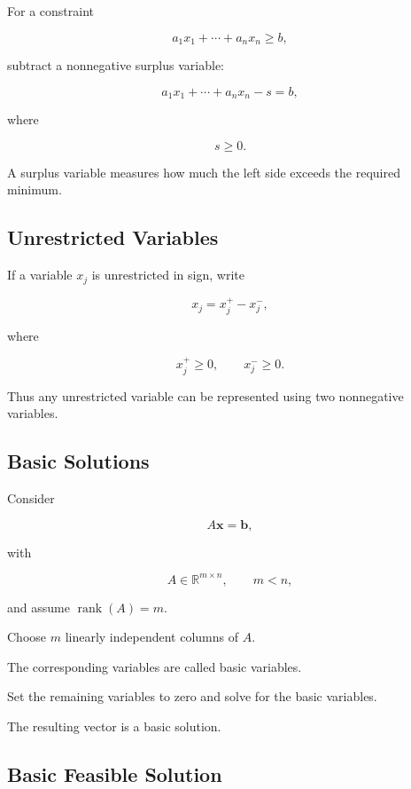 For a constraint

\[
a_1x_1+\cdots+a_nx_n\geq b,
\]

subtract a nonnegative surplus variable:

\[
\boxed{
a_1x_1+\cdots+a_nx_n-s=b,
}
\]

where

\[
\boxed{
s\geq0.
}
\]

A surplus variable measures how much the left side exceeds the required
minimum.

\subsection{Unrestricted Variables}
\label{subsec:unrestricted-lp-variables}

If a variable \(x_j\) is unrestricted in sign, write

\[
\boxed{
x_j
=
x_j^+
-
x_j^-,
}
\]

where

\[
\boxed{
x_j^+\geq0,
\qquad
x_j^-\geq0.
}
\]

Thus any unrestricted variable can be represented using two nonnegative
variables.

\subsection{Basic Solutions}
\label{subsec:lp-basic-solutions}

Consider

\[
A\mathbf{x}=\mathbf{b},
\]

with

\[
A\in\mathbb{R}^{m\times n},
\qquad
m<n,
\]

and assume \(\operatorname{rank}(A)=m\).

Choose \(m\) linearly independent columns of \(A\).

The corresponding variables are called basic variables.

Set the remaining variables to zero and solve for the basic variables.

The resulting vector is a basic solution.

\subsection{Basic Feasible Solution}
\label{subsec:basic-feasible-solution}

